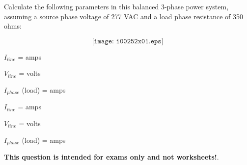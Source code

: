 

Calculate the following parameters in this balanced 3-phase power system, assuming a source phase voltage of 277 VAC and a load phase resistance of 350 ohms:

$$\texttt{[image: i00252x01.eps]}$$

$I_{line}$ = \underbar{\hskip 50pt} amps

\vskip 10pt

$V_{line}$ = \underbar{\hskip 50pt} volts

\vskip 10pt

$I_{phase}$ (load) = \underbar{\hskip 50pt} amps







$I_{line}$ =  amps

$V_{line}$ =  volts

$I_{phase}$ (load) =  amps







{\bf This question is intended for exams only and not worksheets!}.



